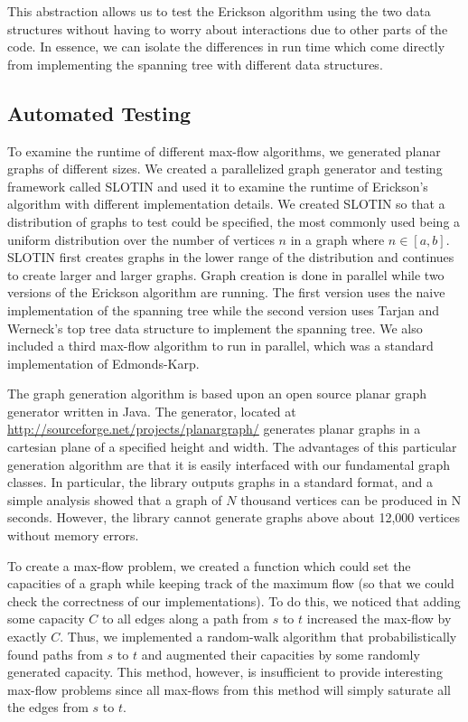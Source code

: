 \documentclass[12pt]{article}
\begin{document}
This abstraction allows us to test the Erickson algorithm using the two data structures without having to worry about interactions due to other parts of the code. In essence, we can isolate the differences in run time which come directly from implementing the spanning tree with different data structures.

\subsection{Automated Testing}

To examine the runtime of different max-flow algorithms, we generated planar graphs of different sizes. We created a parallelized graph generator and testing framework called SLOTIN and used it to examine the runtime of Erickson's algorithm with different implementation details. We created SLOTIN so that a distribution of graphs to test could be specified, the most commonly used being a uniform distribution over the number of vertices $n$ in a graph where $n \in [a,b]$. SLOTIN first creates graphs in the lower range of the distribution and continues to create larger and larger graphs. Graph creation is done in parallel while two versions of the Erickson algorithm are running. The first version uses the naive implementation of the spanning tree while the second version uses Tarjan and Werneck's top tree data structure to implement the spanning tree. We also included a third max-flow algorithm to run in parallel, which was a standard implementation of Edmonds-Karp. 

The graph generation algorithm is based upon an open source planar graph generator written in Java. The generator, located at \url{http://sourceforge.net/projects/planargraph/} generates planar graphs in a cartesian plane of a specified height and width. The advantages of this particular generation algorithm are that it is easily interfaced with our fundamental graph classes. In particular, the library outputs graphs in a standard format, and a simple analysis showed that a graph of $N$ thousand vertices can be produced in N seconds. However, the library cannot generate graphs above about 12,000 vertices without memory errors. 

To create a max-flow problem, we created a function which could set the capacities of a graph while keeping track of the maximum flow (so that we could check the correctness of our implementations). To do this, we noticed that adding some capacity $C$ to all edges along a path from $s$ to $t$ increased the max-flow by exactly $C$. Thus, we implemented a random-walk algorithm that probabilistically found paths from $s$ to $t$ and augmented their capacities by some randomly generated capacity. This method, however, is insufficient to provide interesting max-flow problems since all max-flows from this method will simply saturate all the edges from $s$ to $t$. 
\end{document}
